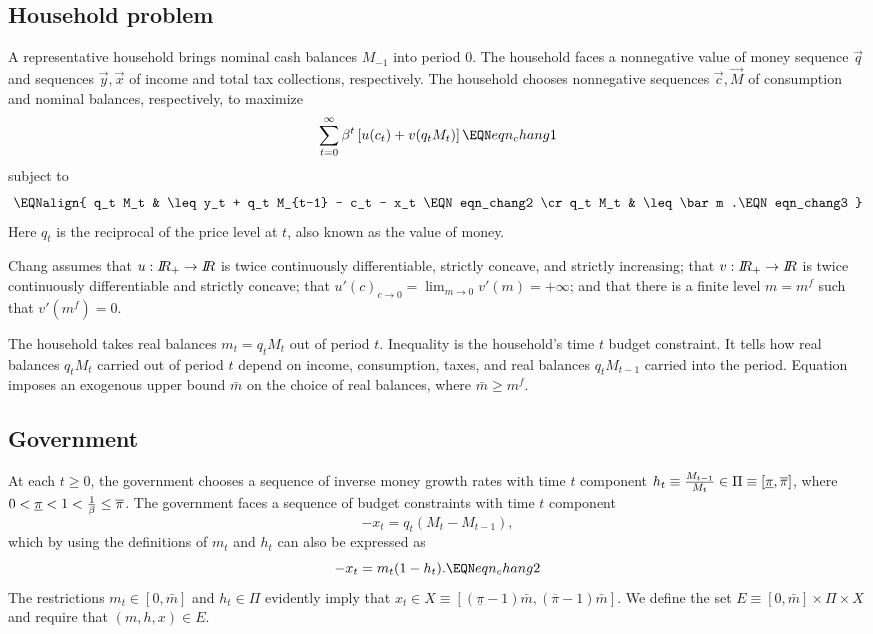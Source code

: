 \subsection{Household problem}
A representative household
 brings nominal cash balances $M_{-1}$ into period $0$.
The household  faces a nonnegative value of money sequence $\vec q$ and sequences $\vec y, \vec x$ of income and total tax collections, respectively.
The household  chooses nonnegative sequences $\vec c, \vec M$ of consumption and nominal balances, respectively, to maximize
$$ \sum_{t=0}^\infty \beta^t \left[ u(c_t) + v(q_t M_t ) \right] \EQN eqn_chang1 $$
subject to
$$ \EQNalign{ q_t M_t & \leq y_t + q_t M_{t-1} - c_t - x_t \EQN eqn_chang2 \cr
              q_t M_t & \leq \bar m .\EQN eqn_chang3 } $$
Here $q_t$ is the reciprocal of the price level at $t$, also known as  the value of money.


Chang assumes that $u: {{I\kern-0.3em R}}_+ \rightarrow {{I\kern-0.3em R}} $ is twice continuously differentiable, strictly concave, and strictly increasing;
that $v: {{I\kern-0.3em R}}_+ \rightarrow {{I\kern-0.3em R}}$ is twice continuously differentiable and strictly concave; that $u'(c)_{c \rightarrow 0}  =
\lim_{m \rightarrow 0} v'(m) = +\infty$; and that there is a finite level $m= m^f$ such that $v'(m^f) =0 $.


The household takes real balances   $m_t = q_t M_t$ out of period $t$. Inequality  is the household's time $t$ budget constraint. It tells how real balances $q_t M_t$ carried out of period $t$ depend
on income, consumption, taxes, and real balances $q_t M_{t-1}$ carried into the period. Equation
 imposes an exogenous upper  bound $\bar m$  on the choice of real balances, where $\bar m \geq m^f$.




\subsection{Government}
At  each $t \geq 0$, the government  chooses a sequence of inverse money growth rates with time $t$ component $h_t \equiv {M_{t-1}\over M_t} \in \Pi \equiv
[ \underline \pi, \overline \pi]$, where $0 < \underline \pi < 1 < { 1 \over \beta } \leq \overline \pi$.
The government faces a sequence of budget constraints with time $t$ component
$$ - x_t = q_t (M_t - M_{t-1}) ,  $$
which by using the definitions of $m_t$ and $h_t$ can also be expressed as
$$ - x_t = m_t (1-h_t).  \EQN eqn_chang2 $$
The  restrictions $m_t \in [0, \bar m]$ and $h_t \in \Pi$ evidently imply
that $x_t \in X \equiv [(\underline  \pi -1)\bar m, (\overline \pi -1) \bar m]$.
We define the set $E \equiv [0,\bar m] \times \Pi \times X$ and require that $(m, h, x) \in E$.


